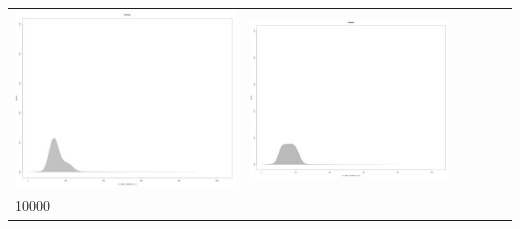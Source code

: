 \begin{table}[htbp]
{\begin{tabular}{l | ccccc}
\begin{minipage}{.15\textwidth}
     			 	\includegraphics[width=\linewidth]{images/mema-dens-graph/N11}
    				 \end{minipage}
    			   &	 \begin{minipage}{.15\textwidth}\vspace{2pt}     							
     			 	\includegraphics[width=\linewidth]{images/mema-dens-graph/N13}
    				 \end{minipage}\\
		10000  &	 \begin{minipage}{.15\textwidth}\vspace{2pt}     							

\end{minipage}
\end{tabular}}
\end{table}
